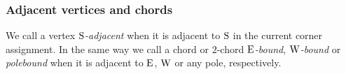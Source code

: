   \subsubsection{Adjacent vertices and chords}
  We call a vertex \emph{$\mathrm{S}$-adjacent} when it is adjacent to $\mathrm{S}$ in the current corner assignment. In the same way we call a chord or $2$-chord \emph{$\mathrm{E}$-bound}, \emph{$\mathrm{W}$-bound} or \emph{polebound} when it is adjacent to $\mathrm{E}$, $\mathrm{W}$ or any pole,  respectively.
